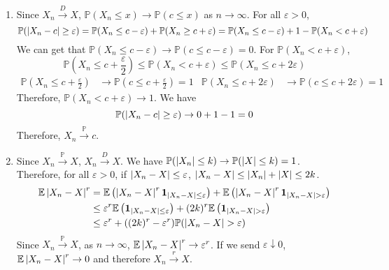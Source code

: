 \documentclass{huhtakm-template-book}
\newcommand{\prob}{\mathbb{P}}
\newcommand{\expect}{\mathbb{E}}
\begin{document}
\begin{proofing}
    \begin{enumerate}
        \item Since $X_{n}\xrightarrow{D}X$, $\prob(X_{n}\leq x)\to\prob(c\leq x)$ as $n\to\infty$. For all $\varepsilon>0$,
        \begin{equation*}
            \prob(\abs{X_{n}-c}\geq\varepsilon)=\prob(X_{n}\leq c-\varepsilon)+\prob(X_{n}\geq c+\varepsilon)=\prob(X_{n}\leq c-\varepsilon)+1-\prob(X_{n}<c+\varepsilon)
        \end{equation*}
        We can get that $\prob(X_{n}\leq c-\varepsilon)\to\prob(c\leq c-\varepsilon)=0$. For $\prob(X_{n}<c+\varepsilon)$,
        \begin{equation*}
            \prob\left(X_{n}\leq c+\frac{\varepsilon}{2}\right)\leq\prob(X_{n}<c+\varepsilon)\leq\prob(X_{n}\leq c+2\varepsilon)
        \end{equation*}
        \begin{align*}
            \prob\left(X_{n}\leq c+\frac{\varepsilon}{2}\right)&\to\prob\left(c\leq c+\frac{\varepsilon}{2}\right)=1 & \prob(X_{n}\leq c+2\varepsilon)&\to\prob(c\leq c+2\varepsilon)=1
        \end{align*}
        Therefore, $\prob(X_{n}<c+\varepsilon)\to 1$. We have
        \begin{equation*}
            \prob(\abs{X_{n}-c}\geq\varepsilon)\to 0+1-1 = 0
        \end{equation*}
        Therefore, $X_{n}\xrightarrow{\prob}c$.
        \item Since $X_{n}\xrightarrow{\prob}X$, $X_{n}\xrightarrow{D}X$. We have $\prob(\abs{X_{n}}\leq k)\to\prob(\abs{X}\leq k)=1$.\\
        Therefore, for all $\varepsilon>0$, if $\left|{X_{n}-X}\right|\leq\varepsilon$, $\left|{X_{n}-X}\right|\leq\left|{X_{n}}\right|+\left|{X}\right|\leq 2k$.
        \begin{align*}
            \expect\abs{X_{n}-X}^{r}&=\expect\left(\abs{X_{n}-X}^{r}\mathbf{1}_{\abs{X_{n}-X}\leq\varepsilon}\right)+\expect\left(\abs{X_{n}-X}^{r}\mathbf{1}_{\abs{X_{n}-X}>\varepsilon}\right)\\
            &\leq\varepsilon^{r}\expect\left(\mathbf{1}_{\abs{X_{n}-X}\leq\varepsilon}\right)+(2k)^{r}\expect\left(\mathbf{1}_{\abs{X_{n}-X}>\varepsilon}\right)\\
            &\leq\varepsilon^{r}+((2k)^{r}-\varepsilon^{r})\prob(\abs{X_{n}-X}>\varepsilon)
        \end{align*}
        Since $X_{n}\xrightarrow{\prob}X$, as $n\to\infty$, $\expect\abs{X_{n}-X}^{r}\to\varepsilon^{r}$. If we send $\varepsilon\downarrow 0$, $\expect\abs{X_{n}-X}^{r}\to 0$ and therefore $X_{n}\xrightarrow{r}X$.
    \end{enumerate}
\end{proofing}
\end{document}
